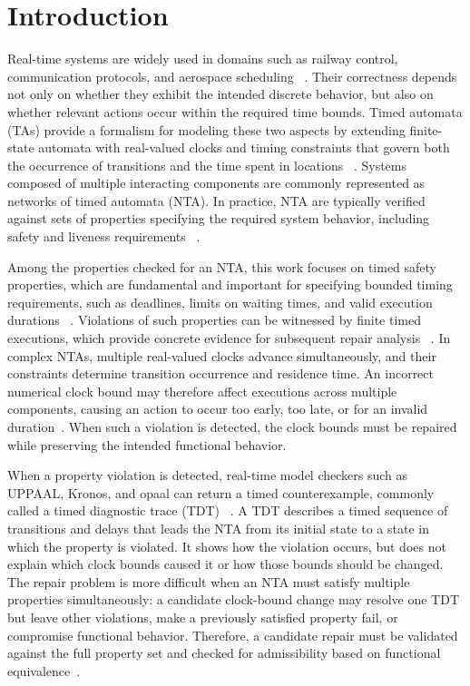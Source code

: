﻿\section{Introduction}
\label{sec:introduction}

Real-time systems are widely used in domains such as railway control,
communication protocols, and aerospace scheduling
~\cite{basile2021unisig,lonn1997tdma,david2010herschel}. Their
correctness depends not only on whether they exhibit the intended
discrete behavior, but also on whether relevant actions occur within the
required time bounds. Timed automata (TAs) provide a formalism for
modeling these two aspects by extending finite-state automata with
real-valued clocks and timing constraints that govern both the
occurrence of transitions and the time spent in locations
~\cite{alur1994theory,bengtsson2004timed}. Systems composed of multiple
interacting components are commonly represented as networks of timed
automata (NTA). In practice, NTA are typically verified against sets of
properties specifying the required system behavior, including safety and
liveness requirements
~\cite{clarke2018handbook,vogel2022patterns}.

Among the properties checked for an NTA, this work focuses on timed
safety properties, which are fundamental and important for specifying
bounded timing requirements, such as deadlines, limits on waiting times,
and valid execution durations
~\cite{konrad2005realtime,vogel2022patterns}. Violations of such properties can be
witnessed by finite timed executions, which provide concrete evidence
for subsequent repair analysis
~\cite{kupferman2001model,kolbl2019clock,vogel2022patterns}.
In complex NTAs, multiple real-valued clocks advance simultaneously, and
their constraints determine transition occurrence and residence time. An
incorrect numerical clock bound may therefore affect executions across
multiple components, causing an action to occur too early, too late, or
for an invalid duration~\cite{kolbl2019clock,jiang2010heart,lonn1997tdma}.
When such a violation is detected, the clock bounds must be repaired
while preserving the intended functional behavior.

When a property violation is detected, real-time model checkers such as
UPPAAL, Kronos, and opaal can return a timed counterexample, commonly
called a timed diagnostic trace (TDT)
~\cite{larsen1997uppaal,daws1996kronos,dalsgaard2011opaal}. A TDT
describes a timed sequence of transitions and delays that leads the NTA
from its initial state to a state in which the property is violated. It
shows how the violation occurs, but does not explain which clock bounds
caused it or how those bounds should be changed. The repair problem is
more difficult when an NTA must satisfy multiple properties
simultaneously: a candidate clock-bound change may resolve one TDT but
leave other violations, make a previously satisfied property fail, or
compromise functional behavior. Therefore, a candidate repair must be
validated against the full property set and checked for admissibility
based on functional equivalence~\cite{kolbl2021automated}.

